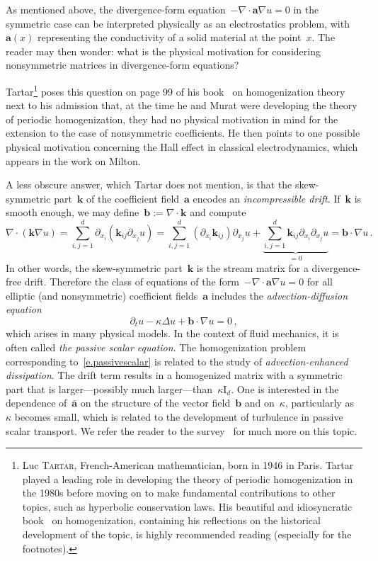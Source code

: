 \documentclass[11pt,twoside]{article} %
\numberwithin{equation}{section}
\theoremstyle{definition}
\newcommand*{\Id}{\ensuremath{\mathrm{I}_d}}
\renewcommand{\b}{\ensuremath{\mathbf{b}}}
\renewcommand{\a}{\mathbf{a}}
\renewcommand{\k}{\mathbf{k}}
\newcommand{\ahom}{\bar{\a}}
\begin{document}
As mentioned above, the divergence-form equation~$-\nabla \cdot \a \nabla u = 0$ in the symmetric case can be interpreted physically as an electrostatics problem, with~$\a(x)$ representing the conductivity of a solid material at the point~$x$. The reader may then wonder: what is the physical motivation for considering nonsymmetric matrices in divergence-form equations?

\smallskip 

Tartar\footnote{Luc \textsc{Tartar}, French-American mathematician, born in 1946 in Paris. Tartar played a leading role in developing the theory of periodic homogenization in the 1980s before moving on to make fundamental contributions to other topics, such as hyperbolic conservation laws. His beautiful and idiosyncratic book~\cite{T} on homogenization, containing his reflections on the historical development of the topic, is highly recommended reading (especially for the footnotes).} 
poses this question on page 99 of his book~\cite{T} on homogenization theory next to his admission that, at the time he and Murat were developing the theory of periodic homogenization, they had no physical motivation in mind for the extension to the case of nonsymmetric coefficients. He then points to one possible physical motivation concerning the Hall effect in classical electrodynamics, which appears in the work on Milton. 

\smallskip

A less obscure answer, which Tartar does not mention, is that the skew-symmetric part~$\k$ of the coefficient field~$\a$ encodes an \emph{incompressible drift}. If~$\k$ is smooth enough, we may define~$\b := \nabla \cdot \k$ and compute 
\begin{equation*}
\nabla\cdot ( \k \nabla u) 
=
\sum_{i,j=1}^d 
\partial_{x_i} (  \k_{ij}\partial_{x_j} u) 
=
\sum_{i,j=1}^d 
(\partial_{x_i} \k_{ij})\partial_{x_j} u + \underbrace{\sum_{i,j=1}^d 
\k_{ij}\partial_{x_i} \partial_{x_j} u}_{=0}
=
\b \cdot \nabla u
\,.
\end{equation*}
In other words, the skew-symmetric part~$\k$ is the stream matrix for a divergence-free drift. Therefore the class of equations of the form~$-\nabla \cdot \a\nabla u=0$ for all elliptic (and  nonsymmetric) coefficient fields~$\a$ includes the \emph{advection-diffusion equation}
\begin{equation}
\label{e.passivescalar}
\partial_t u
-\kappa \Delta u + \b \cdot \nabla u = 0
\,,
\end{equation}
which arises in many physical models. In the context of fluid mechanics, it is often called \emph{the passive scalar equation}. 
The homogenization problem corresponding to~\eqref{e.passivescalar} is related to the study of \emph{advection-enhanced dissipation}. The drift term results in a homogenized matrix with a symmetric part that is larger---possibly much larger---than~$\kappa  \Id$. One is interested in the dependence of~$\ahom$ on the structure of the vector field~$\b$ and on~$\kappa$, particularly as~$\kappa$ becomes small, which is related to the development of turbulence in passive scalar transport. We refer the reader to the survey~\cite{MK} for much more on this topic. 
\end{document}
